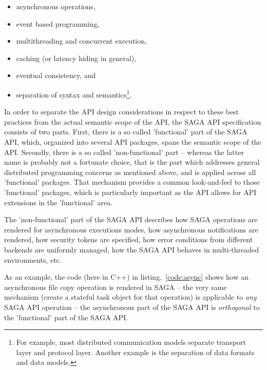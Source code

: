 \documentclass[a4paper,12pt]{article}
\newcommand{\I}[1]{\textit{#1}}
\begin{document}
  \begin{itemize}

   \item asynchronous operations,
   \item event based programming,
   \item multithreading and concurrent execution, 
   \item caching (or latency hiding in general), 
   \item eventual consistency, and 
   \item separation of syntax and semantics\footnote{For example, most
         distributed communication models separate transport layer and 
         protocol layer.  Another example is the separation of data 
         formats and data models.}.
  \end{itemize}

  In order to separate the API design considerations in respect to
  these best practices from the actual semantic scope of the API, the
  SAGA API specification consists of two parts.  First, there is a so
  called 'functional' part of the SAGA API, which, organized into
  several API packages, spans the semantic scope of the API.
  Secondly, there is a so called 'non-functional' part -- whereas the
  latter name is probably not a fortunate choice, that is the part
  which addresses general distributed programming concerns as
  mentioned above, and is applied across all 'functional' packages.
  That mechanism provides a common look-and-feel to those 'functional'
  packages, which is particularly important as the API allows for API
  extensions in the 'functional' area.

  The 'non-functional' part of the SAGA API describes how SAGA
  operations are rendered for asynchronous executions modes, how
  asynchronous notifications are rendered, how security tokens are
  specified, how error conditions from different backends are
  uniformly managed, how the SAGA API behaves in multi-threaded
  environments, etc.

  As an example, the code (here in C++) in listing.~\ref{code:async}
  shows how an asynchronous file copy operation is rendered in SAGA --
  the very same mechanism (create a stateful task object for that
  operation) is applicable to \I{any} SAGA API operation -- the
  asynchronous part of the SAGA API is \I{orthogonal} to the
  'functional' part of the SAGA API.\\
\end{document}
